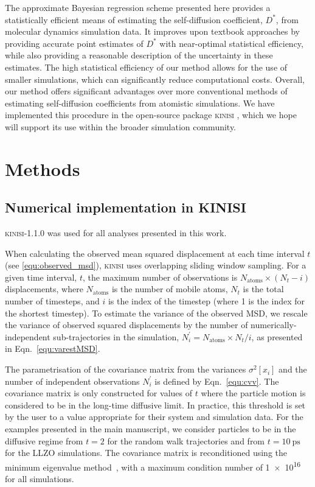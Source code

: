 \documentclass[reprint,superscriptaddress,nobibnotes,amsmath,amssymb,aps,prx,hidelinks]{revtex4-2}
\newcommand{\oMSDi}{\ensuremath{x_i}}
\newcommand{\nind}[1]{\ensuremath{N^\prime_{#1}}}
\newcommand{\D}{\ensuremath{D^*}}
\newcommand{\var}[1]{\ensuremath{\sigma^2[#1]}}
\begin{document}
The approximate Bayesian regression scheme presented here provides a statistically efficient means of estimating the self-diffusion coefficient, $\D$, from molecular dynamics simulation data.
It improves upon textbook approaches by providing accurate point estimates of $\D$ with near-optimal statistical efficiency, while also providing a reasonable description of the uncertainty in these estimates.
The high statistical efficiency of our method allows for the use of smaller simulations, which can significantly reduce computational costs.
Overall, our method offers significant advantages over more conventional methods of estimating self-diffusion coefficients from atomistic simulations.
We have implemented this procedure in the open-source package \textsc{kinisi} \cite{mccluskey_kinisi_2022}, which we hope will support its use within the broader simulation community.

\section{Methods}

\subsection{Numerical implementation in KINISI}
\label{sec:implementation}
\textsc{kinisi}-1.1.0 was used for all analyses presented in this work.  

When calculating the observed mean squared displacement at each time interval $t$ (see \cref{equ:observed_msd}), \textsc{kinisi} uses overlapping sliding window sampling.
For a given time interval, $t$, the maximum number of observations is $N_{\mathrm{atoms}} \times (N_{t} - i)$ displacements, where $N_{\mathrm{atoms}}$ is the number of mobile atoms, $N_{t}$ is the total number of timesteps, and $i$ is the index of the timestep (where \num{1} is the index for the shortest timestep).
To estimate the variance of the observed MSD, we rescale the variance of observed squared displacements by the number of numerically-independent sub-trajectories in the simulation, $\nind{i} = N_{\mathrm{atoms}} \times N_{t} / i$, as presented in Eqn.~\ref{equ:varestMSD}.  

The parametrisation of the covariance matrix from the variances $\var{\oMSDi}$ and the number of independent observations $\nind{i}$ is defined by Eqn.~\ref{equ:cvv}. 
The covariance matrix is only constructed for values of $t$ where the particle motion is considered to be in the long-time diffusive limit.
In practice, this threshold is set by the user to a value appropriate for their system and simulation data. 
For the examples presented in the main manuscript, we consider particles to be in the diffusive regime from $t=\num{2}$ for the random walk trajectories and from $t=\SI{10}{\pico\second}$ for the LLZO simulations.
The covariance matrix is reconditioned using the minimum eigenvalue method~\cite{TabeartEtAl_TellusDynMeteorolOceanogr2020}, with a maximum condition number of \num{1e16} for all simulations.
\end{document}
